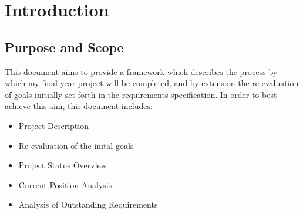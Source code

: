 
\section{Introduction} %



\subsection{Purpose and Scope} %

This document aims to provide a framework which describes the process by which my final year project will be completed, and by extension the re-evaluation of goals initially set forth in the requirements specification. In order to best achieve this aim, this document includes:

\begin{itemize}
\item Project Description
\item Re-evaluation of the inital goals
\item Project Status Overview
\item Current Position Analysis
\item Analysis of Outstanding Requirements
\end{itemize}

